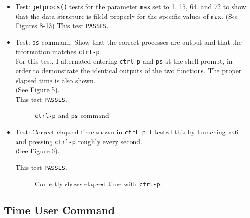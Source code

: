 \documentclass[11pt,letterpaper]{report}
\begin{document}
	\begin{itemize}
	
	\item Test: {\tt getprocs()} tests for the parameter {\tt max} set to 1, 16, 64, and 72 to show that the data structure is fileld properly for the specific values of {\tt max}.
	(See Figures 8-13)
	This test {\tt PASSES}.
	
	\item Test: {\tt ps} command. Show that the correct processes are output and that the information matches {\tt ctrl-p}.\\
	For this test, I alternated entering {\tt ctrl-p} and {\tt ps} at the shell prompt, in order to demonstrate the identical outputs of the two functions. The proper elapsed time is also shown.\\
	(See Figure 5).\\
	This test {\tt PASSES}.
	
\begin{figure}[h!]
	\centering
	\caption[ctrlpps]{{\tt ctrl-p} and {\tt ps} command}
	\label{fig:ctrlppscmdtest}
\end{figure}
	
	\item Test: Correct elapsed time shown in {\tt ctrl-p}.
	I tested this by launching xv6 and pressing {\tt ctrl-p} roughly every second.\\
	(See Figure 6).
	
	This test {\tt PASSES}.
	
\begin{figure}[h!]
	\centering
	\caption[ctrlpps]{Correctly shows elapsed time with {\tt ctrl-p}.}
	\label{fig:ctrlpcorrecttime}
\end{figure}
	
	\end{itemize}
	
	\subsection*{Time User Command}
	
\end{document}
